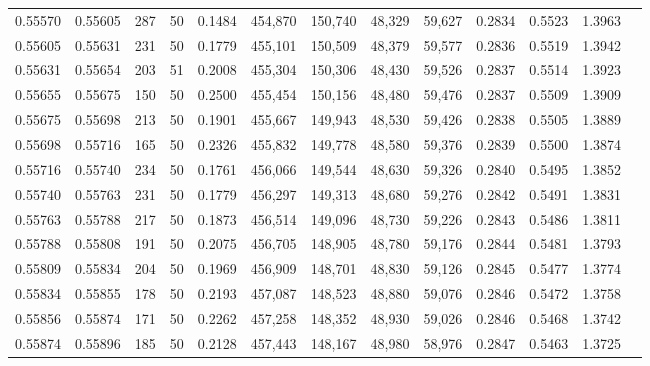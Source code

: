 \begin{tabular}{rrrrrrrrrrrrr}
0.55570 & 0.55605 &   287 &  50 &                                     0.1484 & 454,870 & 150,740 &  48,329 &  59,627 & 0.2834 & 0.5523 & 1.3963 \\
0.55605 & 0.55631 &   231 &  50 &                                     0.1779 & 455,101 & 150,509 &  48,379 &  59,577 & 0.2836 & 0.5519 & 1.3942 \\
0.55631 & 0.55654 &   203 &  51 &                                     0.2008 & 455,304 & 150,306 &  48,430 &  59,526 & 0.2837 & 0.5514 & 1.3923 \\
0.55655 & 0.55675 &   150 &  50 &                                     0.2500 & 455,454 & 150,156 &  48,480 &  59,476 & 0.2837 & 0.5509 & 1.3909 \\
0.55675 & 0.55698 &   213 &  50 &                                     0.1901 & 455,667 & 149,943 &  48,530 &  59,426 & 0.2838 & 0.5505 & 1.3889 \\
0.55698 & 0.55716 &   165 &  50 &                                     0.2326 & 455,832 & 149,778 &  48,580 &  59,376 & 0.2839 & 0.5500 & 1.3874 \\
0.55716 & 0.55740 &   234 &  50 &                                     0.1761 & 456,066 & 149,544 &  48,630 &  59,326 & 0.2840 & 0.5495 & 1.3852 \\
0.55740 & 0.55763 &   231 &  50 &                                     0.1779 & 456,297 & 149,313 &  48,680 &  59,276 & 0.2842 & 0.5491 & 1.3831 \\
0.55763 & 0.55788 &   217 &  50 &                                     0.1873 & 456,514 & 149,096 &  48,730 &  59,226 & 0.2843 & 0.5486 & 1.3811 \\
0.55788 & 0.55808 &   191 &  50 &                                     0.2075 & 456,705 & 148,905 &  48,780 &  59,176 & 0.2844 & 0.5481 & 1.3793 \\
0.55809 & 0.55834 &   204 &  50 &                                     0.1969 & 456,909 & 148,701 &  48,830 &  59,126 & 0.2845 & 0.5477 & 1.3774 \\
0.55834 & 0.55855 &   178 &  50 &                                     0.2193 & 457,087 & 148,523 &  48,880 &  59,076 & 0.2846 & 0.5472 & 1.3758 \\
0.55856 & 0.55874 &   171 &  50 &                                     0.2262 & 457,258 & 148,352 &  48,930 &  59,026 & 0.2846 & 0.5468 & 1.3742 \\
0.55874 & 0.55896 &   185 &  50 &                                     0.2128 & 457,443 & 148,167 &  48,980 &  58,976 & 0.2847 & 0.5463 & 1.3725 \\

\end{tabular}
